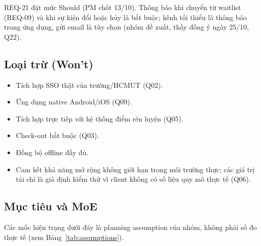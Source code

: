 REQ-21 đặt mức Should (PM chốt 13/10). Thông báo khi chuyển từ waitlist (REQ-09) và khi sự kiện đổi hoặc hủy là bắt buộc; kênh tối thiểu là thông báo trong ứng dụng, gửi email là tùy chọn (nhóm đề xuất, thầy đồng ý ngày 25/10, Q22).

\subsection*{Loại trừ (Won't)}
\begin{itemize}
  \item Tích hợp SSO thật của trường/HCMUT (Q02).
  \item Ứng dụng native Android/iOS (Q09).
  \item Tích hợp trực tiếp với hệ thống điểm rèn luyện (Q05).
  \item Check-out bắt buộc (Q03).
  \item Đồng bộ offline đầy đủ.
  \item Cam kết khả năng mở rộng không giới hạn trong môi trường thực; các giá trị tải chỉ là giả định kiểm thử vì client không có số liệu quy mô thực tế (Q06).
\end{itemize}

\subsection*{Mục tiêu và MoE}
Các mốc hiện trạng dưới đây là planning assumption của nhóm, không phải số đo thực tế (xem Bảng~\ref{tab:assumptions}).

